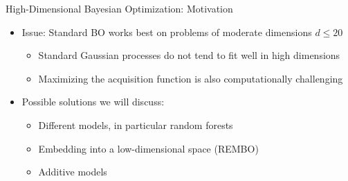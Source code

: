 
\begin{frame}[c]{High-Dimensional Bayesian Optimization: Motivation}

\begin{itemize}
    \item Issue: Standard BO works best on problems of moderate dimensions $d\leq20$
    \begin{itemize}
        \item Standard Gaussian processes do not tend to fit well in high dimensions
        \item Maximizing the acquisition function is also computationally challenging
    \end{itemize}
\medskip
\pause

    \item Possible solutions we will discuss:
    \begin{itemize}
        \item Different models, in particular random forests 
        \item Embedding into a low-dimensional space (REMBO) 
        \item Additive models 
    \end{itemize}
\end{itemize}


\end{frame}



